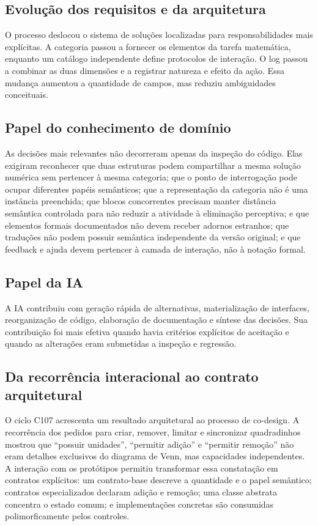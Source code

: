 \documentclass[preprint,12pt,authoryear]{elsarticle}
\begin{document}
\subsection{Evolução dos requisitos e da arquitetura}
O processo deslocou o sistema de soluções localizadas para responsabilidades mais explícitas. A categoria passou a fornecer os elementos da tarefa matemática, enquanto um catálogo independente define protocolos de interação. O log passou a combinar as duas dimensões e a registrar natureza e efeito da ação. Essa mudança aumentou a quantidade de campos, mas reduziu ambiguidades conceituais.

\subsection{Papel do conhecimento de domínio}
As decisões mais relevantes não decorreram apenas da inspeção do código. Elas exigiram reconhecer que duas estruturas podem compartilhar a mesma solução numérica sem pertencer à mesma categoria; que o ponto de interrogação pode ocupar diferentes papéis semânticos; que a representação da categoria não é uma instância preenchida; que blocos concorrentes precisam manter distância semântica controlada para não reduzir a atividade à eliminação perceptiva; e que elementos formais documentados não devem receber adornos estranhos; que traduções não podem possuir semântica independente da versão original; e que feedback e ajuda devem pertencer à camada de interação, não à notação formal.

\subsection{Papel da IA}
A IA contribuiu com geração rápida de alternativas, materialização de interfaces, reorganização de código, elaboração de documentação e síntese das decisões. Sua contribuição foi mais efetiva quando havia critérios explícitos de aceitação e quando as alterações eram submetidas a inspeção e regressão.

\subsection{Da recorrência interacional ao contrato arquitetural}
O ciclo C107 acrescenta um resultado arquitetural ao processo de co-design. A recorrência dos pedidos para criar, remover, limitar e sincronizar quadradinhos mostrou que ``possuir unidades'', ``permitir adição'' e ``permitir remoção'' não eram detalhes exclusivos do diagrama de Venn, mas capacidades independentes. A interação com os protótipos permitiu transformar essa constatação em contratos explícitos: um contrato-base descreve a quantidade e o papel semântico; contratos especializados declaram adição e remoção; uma classe abstrata concentra o estado comum; e implementações concretas são consumidas polimorficamente pelos controles.
\end{document}
